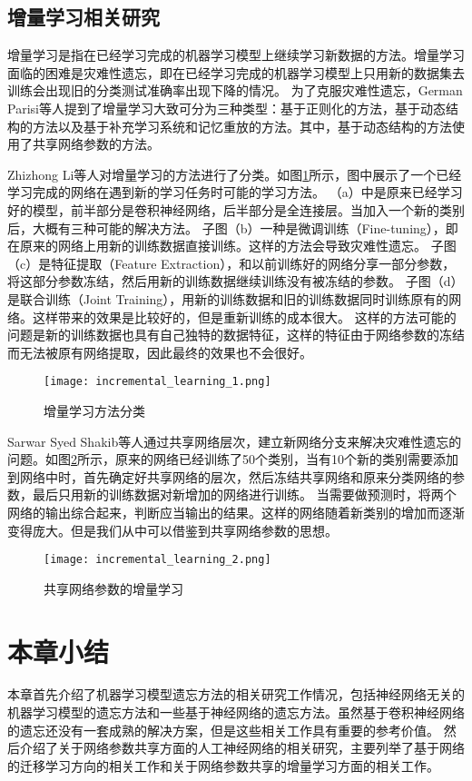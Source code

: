 \subsection{增量学习相关研究}
增量学习是指在已经学习完成的机器学习模型上继续学习新数据的方法。增量学习面临的困难是灾难性遗忘，即在已经学习完成的机器学习模型上只用新的数据集去训练会出现旧的分类测试准确率出现下降的情况。
为了克服灾难性遗忘，German Parisi等人\cite{PARISI201954}提到了增量学习大致可分为三种类型：基于正则化的方法，基于动态结构的方法以及基于补充学习系统和记忆重放的方法。其中，基于动态结构的方法使用了共享网络参数的方法。

Zhizhong Li等人\cite{8107520}对增量学习的方法进行了分类。如图\ref{fig:incremental_learning_1}所示，图中展示了一个已经学习完成的网络在遇到新的学习任务时可能的学习方法。
（a）中是原来已经学习好的模型，前半部分是卷积神经网络，后半部分是全连接层。当加入一个新的类别后，大概有三种可能的解决方法。
子图（b）一种是微调训练（Fine-tuning），即在原来的网络上用新的训练数据直接训练。这样的方法会导致灾难性遗忘。
子图（c）是特征提取（Feature Extraction），和以前训练好的网络分享一部分参数，将这部分参数冻结，然后用新的训练数据继续训练没有被冻结的参数。
子图（d）是联合训练（Joint Training），用新的训练数据和旧的训练数据同时训练原有的网络。这样带来的效果是比较好的，但是重新训练的成本很大。
这样的方法可能的问题是新的训练数据也具有自己独特的数据特征，这样的特征由于网络参数的冻结而无法被原有网络提取，因此最终的效果也不会很好。
\begin{figure}
    \centering
    \texttt{[image: incremental\_learning\_1.png]}
    \caption{增量学习方法分类}
    \label{fig:incremental_learning_1}
\end{figure}

Sarwar Syed Shakib等人\cite{Sarwar_2020}通过共享网络层次，建立新网络分支来解决灾难性遗忘的问题。如图\ref{fig:incremental_learning_2}所示，原来的网络已经训练了50个类别，当有10个新的类别需要添加到网络中时，首先确定好共享网络的层次，然后冻结共享网络和原来分类网络的参数，最后只用新的训练数据对新增加的网络进行训练。
当需要做预测时，将两个网络的输出综合起来，判断应当输出的结果。这样的网络随着新类别的增加而逐渐变得庞大。但是我们从中可以借鉴到共享网络参数的思想。
\begin{figure}
    \centering
    \texttt{[image: incremental\_learning\_2.png]}
    \caption{共享网络参数的增量学习}
    \label{fig:incremental_learning_2}
\end{figure}


\section{本章小结}
本章首先介绍了机器学习模型遗忘方法的相关研究工作情况，包括神经网络无关的机器学习模型的遗忘方法和一些基于神经网络的遗忘方法。虽然基于卷积神经网络的遗忘还没有一套成熟的解决方案，但是这些相关工作具有重要的参考价值。
然后介绍了关于网络参数共享方面的人工神经网络的相关研究，主要列举了基于网络的迁移学习方向的相关工作和关于网络参数共享的增量学习方面的相关工作。